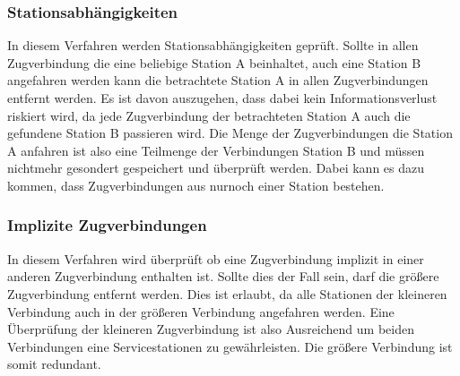 \subsubsection{Stationsabhängigkeiten}
In diesem Verfahren werden Stationsabhängigkeiten geprüft. Sollte in allen Zugverbindung die eine beliebige Station A beinhaltet, auch eine Station B angefahren werden kann die betrachtete Station A in allen Zugverbindungen entfernt werden. Es ist davon auszugehen, dass dabei kein Informationsverlust riskiert wird, da jede Zugverbindung der betrachteten Station A auch die gefundene Station B passieren wird. Die Menge der Zugverbindungen die Station A anfahren ist also eine Teilmenge der Verbindungen Station B und müssen nichtmehr gesondert gespeichert und überprüft werden. Dabei kann es dazu kommen, dass Zugverbindungen aus nurnoch einer Station bestehen.\\

\subsubsection{Implizite Zugverbindungen}
In diesem Verfahren wird überprüft ob eine Zugverbindung implizit in einer anderen Zugverbindung enthalten ist. Sollte dies der Fall sein, darf die größere Zugverbindung entfernt werden. Dies ist erlaubt, da alle Stationen der kleineren Verbindung auch in der größeren Verbindung angefahren werden. Eine Überprüfung der kleineren Zugverbindung ist also Ausreichend um beiden Verbindungen eine Servicestationen zu gewährleisten. Die größere Verbindung ist somit redundant.\\

